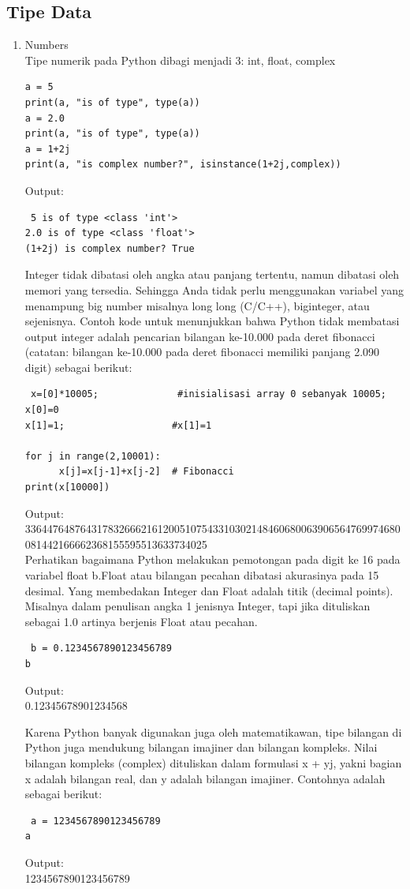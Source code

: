 \subsection{Tipe Data}
\begin{enumerate}
 \item Numbers\\
 Tipe numerik pada Python dibagi menjadi 3: int, float, complex
 \begin{verbatim}
a = 5
print(a, "is of type", type(a))
a = 2.0
print(a, "is of type", type(a))
a = 1+2j
print(a, "is complex number?", isinstance(1+2j,complex))
 \end{verbatim}
 
 Output:
 \begin{verbatim}
 5 is of type <class 'int'>
2.0 is of type <class 'float'>
(1+2j) is complex number? True
 \end{verbatim}
 Integer tidak dibatasi oleh angka atau panjang tertentu, namun dibatasi oleh memori yang tersedia. Sehingga Anda tidak perlu menggunakan variabel yang menampung big number misalnya long long (C/C++), biginteger, atau sejenisnya. Contoh kode untuk menunjukkan bahwa Python tidak membatasi output integer adalah pencarian bilangan ke-10.000 pada deret fibonacci (catatan: bilangan ke-10.000 pada deret fibonacci memiliki panjang 2.090 digit) sebagai berikut:
 \begin{verbatim}
 x=[0]*10005;              #inisialisasi array 0 sebanyak 10005; x[0]=0
x[1]=1;                   #x[1]=1
 
for j in range(2,10001):
      x[j]=x[j-1]+x[j-2]  # Fibonacci
print(x[10000])
 \end{verbatim}
 Output:\\
 33644764876431783266621612005107543310302148460680063906564769974680081442166662368155595513633734025\\
 Perhatikan bagaimana Python melakukan pemotongan pada digit ke 16 pada variabel float b.Float atau bilangan pecahan dibatasi akurasinya pada 15 desimal. Yang membedakan Integer dan Float adalah titik (decimal points). Misalnya dalam penulisan angka 1 jenisnya Integer, tapi jika dituliskan sebagai 1.0 artinya berjenis Float atau pecahan.
 \begin{verbatim}
 b = 0.1234567890123456789
b
 \end{verbatim}
 Output:\\
 0.12345678901234568
 
 Karena Python banyak digunakan juga oleh matematikawan, tipe bilangan di Python juga mendukung bilangan imajiner dan bilangan kompleks. Nilai bilangan kompleks (complex) dituliskan dalam formulasi x + yj, yakni bagian x adalah bilangan real, dan y adalah bilangan imajiner. Contohnya adalah sebagai berikut:
 \begin{verbatim}
 a = 1234567890123456789
a
 \end{verbatim}
 Output:\\
 1234567890123456789
 

\end{enumerate}
